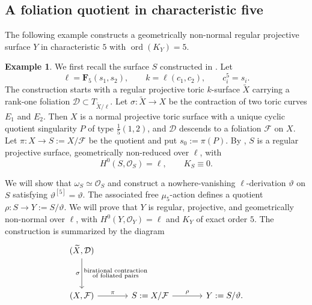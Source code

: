 \documentclass[10pt,abstract=true]{scrartcl}
\numberwithin{equation}{section}
\theoremstyle{definition}
\newtheorem{example}[theorem]{Example}
\theoremstyle{remark}
\DeclareMathOperator\ord{ord}
\begin{document}
\subsection{A foliation quotient in characteristic five}\label{sec:caseC-order-five-example}%
The following example constructs a geometrically non-normal regular projective surface $Y$ in characteristic $5$ with $\ord(K_Y) = 5$.

\begin{example}\label{ex:case-C-p5}
  We first recall the surface \(S\) constructed in \cite[\S6.1]{WZ26}.
  Let
  \[
    \ell=\mathbf F_5(s_1,s_2),\qquad
    k=\ell(c_1,c_2),\qquad c_i^5=s_i.
  \]
  The construction starts with a regular projective toric \(k\)-surface \(\widetilde X\) carrying a rank-one foliation \(\mathcal D\subset T_{\widetilde X/\ell}\).
  Let \(\sigma\colon\widetilde X\to X\) be the contraction of two toric curves \(E_1\) and \(E_2\).
  Then \(X\) is a normal projective toric surface with a unique cyclic quotient singularity \(P\) of type \(\frac15(1,2)\), and \(\mathcal D\) descends to a foliation \(\mathcal F\) on \(X\).
  Let \(\pi\colon X\to S:=X/\mathcal F\) be the quotient and put \(s_0:=\pi(P)\).
  By \cite[Theorem~6.1]{WZ26}, \(S\) is a regular projective surface, geometrically non-reduced over \(\ell\), with
  \[
    H^0(S,\mathcal O_S)=\ell,\qquad K_S\equiv0.
  \]

  We will show that \(\omega_S\simeq\mathcal O_S\) and construct a nowhere-vanishing \(\ell\)-derivation \(\vartheta\) on \(S\) satisfying \(\vartheta^{[5]}=\vartheta\).
  The associated free \(\mu_5\)-action defines a quotient \(\rho\colon S\to Y:=S/\vartheta\).
  We will prove that \(Y\) is regular, projective, and geometrically non-normal over \(\ell\), with \(H^0(Y,\mathcal O_Y)=\ell\) and \(K_Y\) of exact order \(5\).
  The construction is summarized by the diagram
  \[
    \begin{tikzcd}[column sep=large,row sep=huge]
      (\widetilde X,\mathcal D)
      \arrow[d,"\sigma" left,"\substack{\text{birational contraction}\\\text{of foliated pairs}}" right] \\
      (X,\mathcal F)
      \arrow[r,"\pi"] &
      S:=X/\mathcal F
      \arrow[r,"\rho"] &
      Y:=S/\vartheta.
    \end{tikzcd}
  \]


\end{example}
\end{document}
